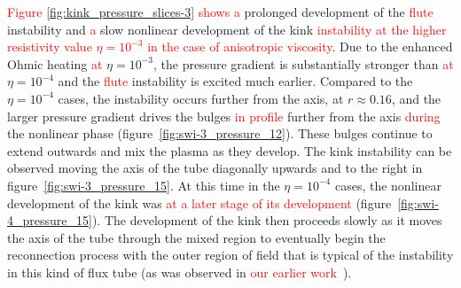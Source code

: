 \documentclass[12pt]{article}
\newcommand{\rs}[2]{\textcolor{red}{#2}}
\begin{document}
\rs{Figures \ref{fig:kink_pressure_slices-3} show the}{Figure
  \ref{fig:kink_pressure_slices-3} shows a} prolonged 
development of the \rs{fluting}{flute} instability and \rs{the}{a} slow
nonlinear development of the kink \rs{}{instability at the higher
  resistivity value $\eta=10^{-3}$ in the case of anisotropic viscosity}. Due to the enhanced Ohmic heating 
\rs{when}{at} $\eta=10^{-3}$, the pressure gradient is substantially stronger
than \rs{when}{at} $\eta=10^{-4}$ and the \rs{fluting}{flute} instability is
excited much earlier. Compared to the $\eta=10^{-4}$ cases, the
instability occurs further from the axis, at $r\approx0.16$, and the
larger pressure gradient drives the bulges \rs{}{in profile} further
from the axis \rs{in}{during} the nonlinear phase
(figure~\ref{fig:swi-3_pressure_12}). These bulges continue to extend
outwards and mix the plasma as they develop. The kink instability can
be observed moving the axis of the tube diagonally upwards and to the
right in figure~\ref{fig:swi-3_pressure_15}. At this time in the
$\eta=10^{-4}$ cases, the nonlinear development of the kink was
\rs{further along}{at a later stage of its development} (figure~\ref{fig:swi-4_pressure_15}). The development of
the kink then proceeds slowly as it moves the axis of the tube through
the mixed region to eventually begin the reconnection process with the
outer region of field that is typical of the instability in this kind
of flux tube (as was observed in
\rs{chapter}{our earlier work}~\cite{quinnEffectAnisotropicViscosity2020}). 
\end{document}
